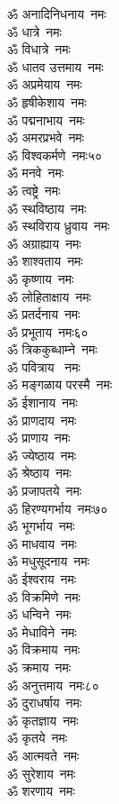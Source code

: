 \begin{multicols}{2}
\begin{flushleft}
ॐ अनादिनिधनाय~नमः\\
ॐ धात्रे~नमः\\
ॐ विधात्रे~नमः\\
ॐ धातव उत्तमाय~नमः\\
ॐ अप्रमेयाय~नमः\\
ॐ हृषीकेशाय~नमः\\
ॐ पद्मनाभाय~नमः\\
ॐ अमरप्रभवे~नमः\\
ॐ विश्वकर्मणे~नमः\hfill ५०\\
ॐ मनवे~नमः\\
ॐ त्वष्ट्रे~नमः\\
ॐ स्थविष्ठाय~नमः\\
ॐ स्थविराय ध्रुवाय~नमः\\
ॐ अग्राह्याय~नमः\\
ॐ शाश्वताय~नमः\\
ॐ कृष्णाय~नमः\\
ॐ लोहिताक्षाय~नमः\\
ॐ प्रतर्दनाय~नमः\\
ॐ प्रभूताय~नमः\hfill ६०\\
ॐ त्रिककुब्धाम्ने~नमः\\
ॐ पवित्राय ~नमः\\
ॐ मङ्गळाय परस्मै~नमः\\
ॐ ईशानाय~नमः\\
ॐ प्राणदाय~नमः\\
ॐ प्राणाय~नमः\\
ॐ ज्येष्ठाय~नमः\\
ॐ श्रेष्ठाय~नमः\\
ॐ प्रजापतये~नमः\\
ॐ हिरण्यगर्भाय~नमः\hfill ७०\\
ॐ भूगर्भाय~नमः\\
ॐ माधवाय~नमः\\
ॐ मधुसूदनाय~नमः\\
ॐ ईश्वराय~नमः\\
ॐ विक्रमिणे~नमः\\
ॐ धन्विने~नमः\\
ॐ मेधाविने~नमः\\
ॐ विक्रमाय~नमः\\
ॐ क्रमाय~नमः\\
ॐ अनुत्तमाय~नमः\hfill ८०\\
ॐ दुराधर्षाय~नमः\\
ॐ कृतज्ञाय~नमः\\
ॐ कृतये~नमः\\
ॐ आत्मवते~नमः\\
ॐ सुरेशाय~नमः\\
ॐ शरणाय~नमः\\

\end{flushleft}
\end{multicols}
